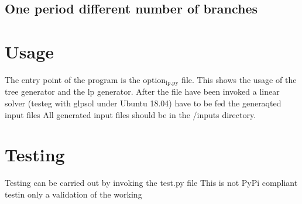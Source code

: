 \documentclass[11pt]{article}
\begin{document}
\subsection{One period different number of branches}
\label{sec:orgcbb7f6a}
\section{Usage}
\label{sec:org71d872d}
The entry point of the program is the option\(_{\text{lp.py}}\) file.
This shows the usage of the tree generator and the lp generator.
After the file have been invoked a linear solver (testeg with glpsol under Ubuntu 18.04) have to be fed the generaqted input files
All generated input files should be in the /inputs directory.

\section{Testing}
\label{sec:org17e587d}
Testing can be carried out by invoking the test.py file
This is not PyPi compliant testin only a validation of the working 
\end{document}
